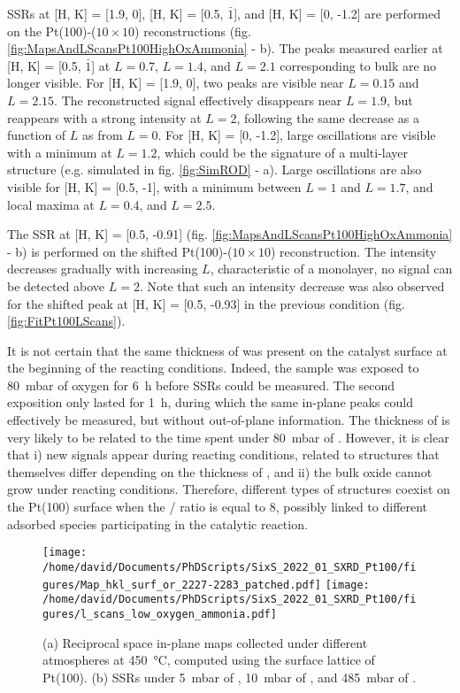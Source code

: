 SSRs at [H, K] = [1.9, 0], [H, K] = [0.5,  $\bar{1}$], and [H, K] = [0, -1.2] are performed on the Pt(100)-($10\times10$) reconstructions (fig. \ref{fig:MapsAndLScansPt100HighOxAmmonia} - b).
The peaks measured earlier at [H, K] = [0.5, $\bar{1}$] at $L=0.7$, $L=1.4$, and $L=2.1$ corresponding to bulk  are no longer visible.
For [H, K] = [1.9, 0], two peaks are visible near $L=0.15$ and $L=2.15$.
The reconstructed signal effectively disappears near $L=1.9$, but reappears with a strong intensity at $L=2$, following the same decrease as a function of $L$ as from $L=0$.
For [H, K] = [0, -1.2], large oscillations are visible with a minimum at $L=1.2$, which could be the signature of a multi-layer structure (e.g. simulated  in fig. \ref{fig:SimROD} - a).
Large oscillations are also visible for [H, K] = [0.5, -1], with a minimum between $L=1$ and $L=1.7$, and local maxima at $L=0.4$, and $L=2.5$.

The SSR at [H, K] = [0.5, -0.91] (fig. \ref{fig:MapsAndLScansPt100HighOxAmmonia} - b) is performed on the shifted Pt(100)-($10\times10$) reconstruction.
The intensity decreases gradually with increasing $L$, characteristic of a monolayer, no signal can be detected above $L=2$.
Note that such an intensity decrease was also observed for the shifted peak at [H, K] = [0.5, -0.93] in the previous condition (fig. \ref{fig:FitPt100LScans}).

It is not certain that the same thickness of  was present on the catalyst surface at the beginning of the reacting conditions.
Indeed, the sample was exposed to \qty{80}{\milli\bar} of oxygen for \qty{6}{\hour} before SSRs could be measured.
The second exposition only lasted for \qty{1}{\hour}, during which the same in-plane peaks could effectively be measured, but without out-of-plane information.
The thickness of  is very likely to be related to the time spent under \qty{80}{\milli\bar} of .
However, it is clear that i) new signals appear during reacting conditions, related to structures that themselves differ depending on the thickness of , and ii) the bulk oxide cannot grow under reacting conditions.
Therefore, different types of structures coexist on the Pt(100) surface when the / ratio is equal to \num{8}, possibly linked to different adsorbed species participating in the catalytic reaction.

\begin{figure}[!htb]
    \centering
    \texttt{[image: /home/david/Documents/PhDScripts/SixS\_2022\_01\_SXRD\_Pt100/figures/Map\_hkl\_surf\_or\_2227-2283\_patched.pdf]}
    \texttt{[image: /home/david/Documents/PhDScripts/SixS\_2022\_01\_SXRD\_Pt100/figures/l\_scans\_low\_oxygen\_ammonia.pdf]}
    \caption{
        (a) Reciprocal space in-plane maps collected under different atmospheres at \qty{450}{\degreeCelsius}, computed using the surface lattice of Pt(100).
        (b) SSRs under \qty{5}{\milli\bar} of , \qty{10}{\milli\bar} of , and \qty{485}{\milli\bar} of .
    }
    \label{fig:MapsAndLScansPt100LowOxAmmonia}
\end{figure}


